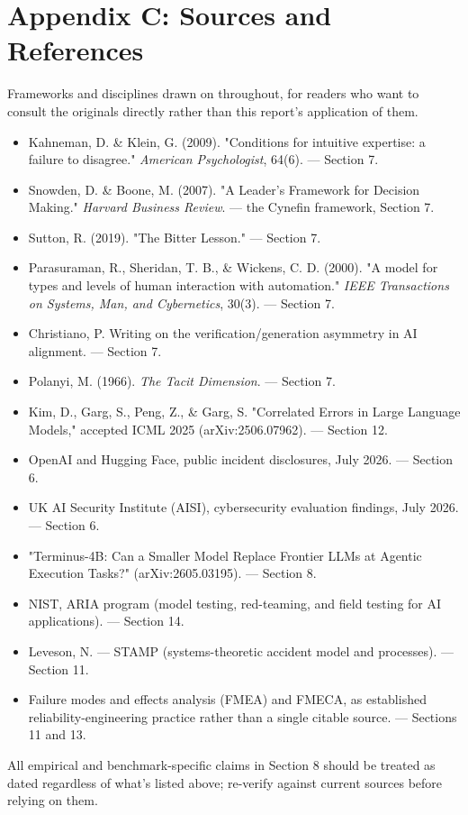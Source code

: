 \section*{Appendix C: Sources and References}

Frameworks and disciplines drawn on throughout, for readers who want to consult the originals directly rather than this report's application of them.

\begin{itemize}
\item Kahneman, D. \& Klein, G. (2009). "Conditions for intuitive expertise: a failure to disagree." \emph{American Psychologist}, 64(6). --- Section 7.
\item Snowden, D. \& Boone, M. (2007). "A Leader's Framework for Decision Making." \emph{Harvard Business Review}. --- the Cynefin framework, Section 7.
\item Sutton, R. (2019). "The Bitter Lesson." --- Section 7.
\item Parasuraman, R., Sheridan, T. B., \& Wickens, C. D. (2000). "A model for types and levels of human interaction with automation." \emph{IEEE Transactions on Systems, Man, and Cybernetics}, 30(3). --- Section 7.
\item Christiano, P. Writing on the verification/generation asymmetry in AI alignment. --- Section 7.
\item Polanyi, M. (1966). \emph{The Tacit Dimension}. --- Section 7.
\item Kim, D., Garg, S., Peng, Z., \& Garg, S. "Correlated Errors in Large Language Models," accepted ICML 2025 (arXiv:2506.07962). --- Section 12.
\item OpenAI and Hugging Face, public incident disclosures, July 2026. --- Section 6.
\item UK AI Security Institute (AISI), cybersecurity evaluation findings, July 2026. --- Section 6.
\item "Terminus-4B: Can a Smaller Model Replace Frontier LLMs at Agentic Execution Tasks?" (arXiv:2605.03195). --- Section 8.
\item NIST, ARIA program (model testing, red-teaming, and field testing for AI applications). --- Section 14.
\item Leveson, N. --- STAMP (systems-theoretic accident model and processes). --- Section 11.
\item Failure modes and effects analysis (FMEA) and FMECA, as established reliability-engineering practice rather than a single citable source. --- Sections 11 and 13.
\end{itemize}

All empirical and benchmark-specific claims in Section 8 should be treated as dated regardless of what's listed above; re-verify against current sources before relying on them.
